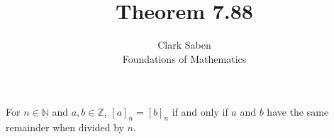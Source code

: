 \documentclass[12pt]{article}
\newenvironment{theorem}[2][Theorem]{\begin{trivlist}
\item[\hskip \labelsep {\bfseries #1}\hskip \labelsep {\bfseries #2.}]}{\end{trivlist}}
\begin{document}
 
 
\title{Theorem 7.88}%
\author{Clark Saben\\ %
Foundations of Mathematics} %
 
\maketitle

\begin{theorem}{7.88}
	For $n \in \mathbb{N}$ and $a,b \in \mathbb{Z}$, $[a]_n = [b]_n$ if and only if $a$ and $b$ have the same remainder when divided by $n$.
\end{theorem}
\end{document}
